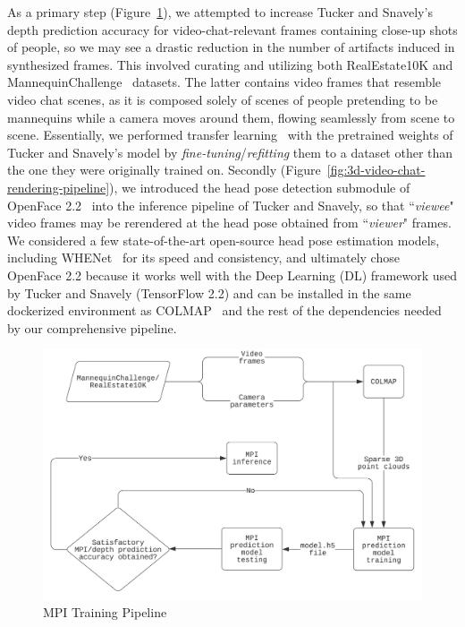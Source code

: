 As a primary step (Figure~\ref{fig:mpi-training-pipeline}), we attempted to increase Tucker and Snavely's depth prediction accuracy for video-chat-relevant frames containing close-up shots of people, so we may see a drastic reduction in the number of artifacts induced in synthesized frames. This involved curating and utilizing both RealEstate10K and MannequinChallenge~\cite{li2019learning} datasets. The latter contains video frames that resemble video chat scenes, as it is composed solely of scenes of people pretending to be mannequins while a camera moves around them, flowing seamlessly from scene to scene. Essentially, we performed transfer learning~\cite{radhakrishnan_what_2019} with the pretrained weights of Tucker and Snavely's model by \textit{fine-tuning}/\textit{refitting} them to a dataset other than the one they were originally trained on. Secondly (Figure~\ref{fig:3d-video-chat-rendering-pipeline}), we introduced the head pose detection submodule of OpenFace 2.2~\cite{baltrusaitis_openface_2018} into the inference pipeline of Tucker and Snavely, so that ``\textit{viewee}" video frames may be rerendered at the head pose obtained from ``\textit{viewer}" frames. We considered a few state-of-the-art open-source head pose estimation models, including WHENet~\cite{zhou_whenet_2020} for its speed and consistency, and ultimately chose OpenFace 2.2 because it works well with the Deep Learning (DL) framework used by Tucker and Snavely (TensorFlow 2.2) and can be installed in the same dockerized environment as COLMAP~\cite{schoenberger2016sfm,schoenberger2016mvs} and the rest of the dependencies needed by our comprehensive pipeline. 

\begin{figure}[!h]
    \includegraphics[width=1\columnwidth]{figures/mpi-training-pipeline.png}
    \caption{MPI Training Pipeline}
    \label{fig:mpi-training-pipeline}
\end{figure}

